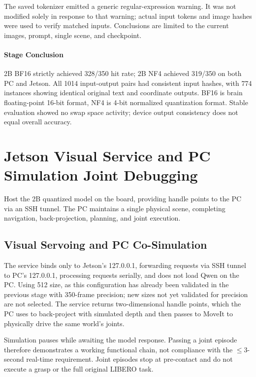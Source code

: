 The saved tokenizer emitted a generic regular-expression warning. It was not modified solely in response to that warning; actual input tokens and image hashes were used to verify matched inputs. Conclusions are limited to the current images, prompt, single scene, and checkpoint.


\paragraph{Stage Conclusion} 2B BF16 strictly achieved 328/350 hit rate; 2B NF4 achieved 319/350 on both PC and Jetson. All 1014 input-output pairs had consistent input hashes, with 774 instances showing identical original text and coordinate outputs. BF16 is brain floating-point 16-bit format, NF4 is 4-bit normalized quantization format. Stable evaluation showed no swap space activity; device output consistency does not equal overall accuracy.


\FloatBarrier

\section{Jetson Visual Service and PC Simulation Joint Debugging}

\label{stage:s23}

Host the 2B quantized model on the board, providing handle points to the PC via an SSH tunnel. The PC maintains a single physical scene, completing navigation, back-projection, planning, and joint execution.

\subsection{Visual Servoing and PC Co-Simulation}\label{s23-detail-1}

The service binds only to Jetson's 127.0.0.1, forwarding requests via SSH tunnel to PC's 127.0.0.1, processing requests serially, and does not load Qwen on the PC. Using 512 size, as this configuration has already been validated in the previous stage with 350-frame precision; new sizes not yet validated for precision are not selected. The service returns two-dimensional handle points, which the PC uses to back-project with simulated depth and then passes to MoveIt to physically drive the same world's joints.

Simulation pauses while awaiting the model response. Passing a joint episode therefore demonstrates a working functional chain, not compliance with the \(\leq\)3-second real-time requirement. Joint episodes stop at pre-contact and do not execute a grasp or the full original LIBERO task.

